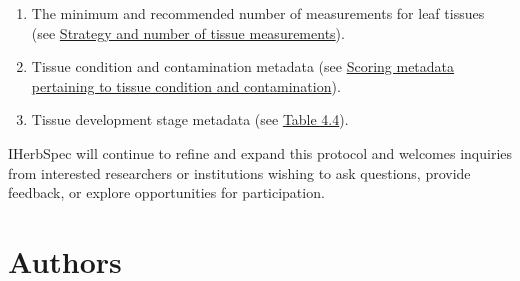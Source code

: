 \documentclass[
  letterpaper,
  DIV=11,
  numbers=noendperiod]{scrreprt}
\providecommand{\tightlist}{%
  \setlength{\itemsep}{0pt}\setlength{\parskip}{0pt}}
\begin{document}
\begin{enumerate}
\def\labelenumi{\arabic{enumi}.}
\tightlist
\item
  The minimum and recommended number of measurements for leaf tissues
  (see \hyperref[strategy-and-number-of-tissue-measurements]{Strategy
  and number of tissue measurements}).
\item
  Tissue condition and contamination metadata (see
  \hyperref[scoring-metadata-pertaining-to-tissue-condition-and-contamination]{Scoring
  metadata pertaining to tissue condition and contamination}).
\item
  Tissue development stage metadata (see \hyperref[tbl-4-4]{Table 4.4}).
\end{enumerate}

IHerbSpec will continue to refine and expand this protocol and welcomes
inquiries from interested researchers or institutions wishing to ask
questions, provide feedback, or explore opportunities for participation.

\section{Authors}\label{authors}
\end{document}
